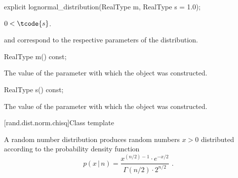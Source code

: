 %
\begin{itemdecl}
explicit lognormal_distribution(RealType m, RealType s = 1.0);
\end{itemdecl}

\begin{itemdescr}
\pnum
\expects
$0 < \tcode{s}$.

\pnum
\remarks
{} and 
correspond to the respective parameters of the distribution.
\end{itemdescr}

%
\begin{itemdecl}
RealType m() const;
\end{itemdecl}

\begin{itemdescr}
\pnum
\returns
The value of the  parameter
 with which the object was constructed.
\end{itemdescr}

%
\begin{itemdecl}
RealType s() const;
\end{itemdecl}

\begin{itemdescr}
\pnum
\returns
The value of the  parameter
 with which the object was constructed.
\end{itemdescr}


[rand.dist.norm.chisq]{Class template }%
%

\pnum
A  random number distribution
produces random numbers $x > 0$
distributed according to
the probability density function%
\[ p(x\,|\,n) = \frac{x^{(n/2)-1} \cdot e^{-x/2}}{\Gamma(n/2) \cdot 2^{n/2}} \text{ .} \]

